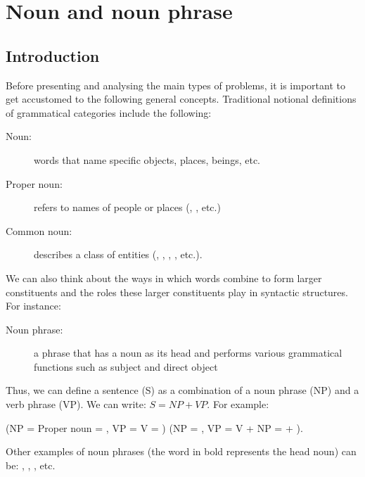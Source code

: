 \begin{refsection}
\hypertarget{noun}{%
\chapter{Noun and noun phrase}\label{chap-noun}}

\section{Introduction}

 Before presenting and analysing the main types of problems, it is important to get accustomed to the following general concepts. Traditional notional definitions of grammatical categories include the following:

\begin{description}
    \item[Noun:] words that name specific objects, places, beings, etc.
    \item[Proper noun:] refers to names of people or places (, , etc.)
    \item[Common noun:] describes a class of entities (, , , , etc.).
\end{description}

 We can also think about the ways in which words combine to form larger constituents and the roles these larger constituents play in syntactic structures. For instance:

\begin{description}
    \item[Noun phrase:] a phrase that has a noun as its head and performs various grammatical functions such as subject and direct object
\end{description}

 Thus, we can define a sentence (S) as a combination of a noun phrase (NP) and a verb phrase (VP). We can write: $S = NP + VP$. For example:

\ea
    \ea {} (NP = Proper noun = , VP = V = )
    \ex {} (NP = , VP = V + NP =  + ).
    \z
\z

Other examples of noun phrases (the word in bold represents the head noun) can be: , , , etc.


\end{refsection}
